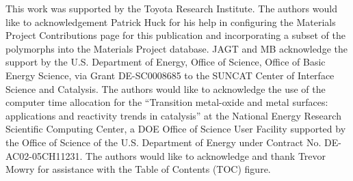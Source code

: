 

This work was supported by the Toyota Research Institute.
%
The authors would like to acknowledgement Patrick Huck for his help in configuring the Materials Project Contributions page for this publication and incorporating a subset of the \IrOx polymorphs into the Materials Project database.
%
JAGT and MB acknowledge the support by the U.S. Department of Energy, Office
of Science, Office of Basic Energy Science, via Grant DE-SC0008685 to the
SUNCAT Center of Interface Science and Catalysis.
%
The authors would like to acknowledge the use of the computer time allocation
for the
“Transition metal-oxide and metal surfaces: applications and
reactivity trends in catalysis”
at the National Energy Research Scientific Computing Center, a DOE Office of Science User Facility supported by the Office of Science of the U.S. Department of Energy under Contract No. DE-AC02-05CH11231.
%
The authors would like to acknowledge and thank Trevor Mowry for assistance with the Table of Contents (TOC) figure.
